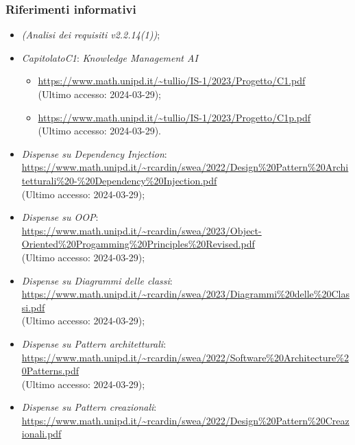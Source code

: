 \documentclass[10pt, a4paper]{article}
\begin{document}
    \subsubsection{Riferimenti informativi}
    \begin{itemize}
        \item \textit{(Analisi dei requisiti v2.2.14(1))};
        \item \textit{Capitolato\pg C1}: \textit{Knowledge Management AI}
        \begin{itemize}
            \item \url{https://www.math.unipd.it/~tullio/IS-1/2023/Progetto/C1.pdf}\\
            (Ultimo accesso: 2024-03-29);
            \item \url{https://www.math.unipd.it/~tullio/IS-1/2023/Progetto/C1p.pdf}\\
            (Ultimo accesso: 2024-03-29).
        \end{itemize}
        \item \textit{Dispense su Dependency Injection}: \\
            \url{https://www.math.unipd.it/~rcardin/swea/2022/Design%20Pattern%20Architetturali%20-%20Dependency%20Injection.pdf}\\
            (Ultimo accesso: 2024-03-29);
        \item \textit{Dispense su OOP}: \\
            \url{https://www.math.unipd.it/~rcardin/swea/2023/Object-Oriented%20Progamming%20Principles%20Revised.pdf}\\
            (Ultimo accesso: 2024-03-29);
        \item \textit{Dispense su Diagrammi delle classi}: \\
            \url{https://www.math.unipd.it/~rcardin/swea/2023/Diagrammi%20delle%20Classi.pdf}\\
            (Ultimo accesso: 2024-03-29);
        \item \textit{Dispense su Pattern architetturali}: \\
            \url{https://www.math.unipd.it/~rcardin/swea/2022/Software%20Architecture%20Patterns.pdf}\\
            (Ultimo accesso: 2024-03-29);
        \item \textit{Dispense su Pattern creazionali}: \\
            \url{https://www.math.unipd.it/~rcardin/swea/2022/Design%20Pattern%20Creazionali.pdf}\\

\end{itemize}
\end{document}
